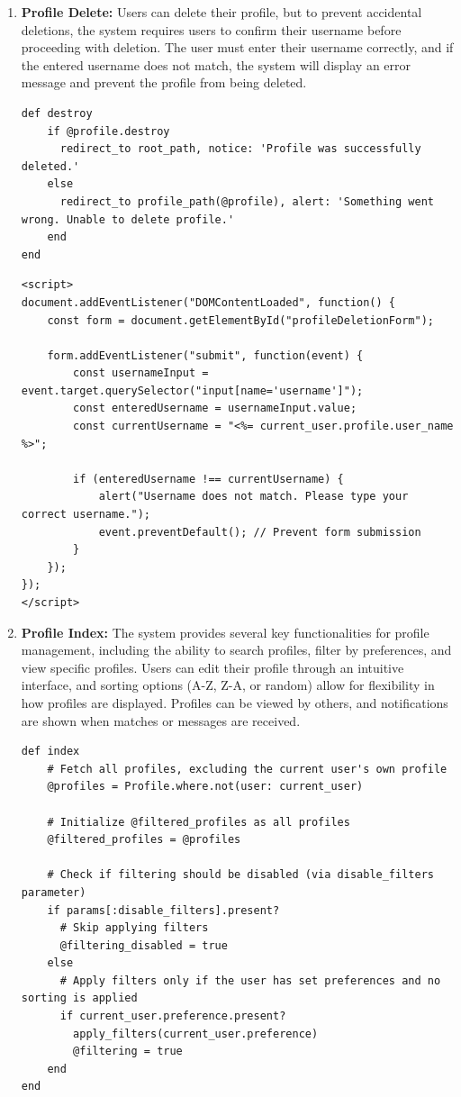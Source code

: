 \begin{enumerate}
    \newpage
    \item \textbf{Profile Delete:} 
    Users can delete their profile, but to prevent accidental deletions, the system requires users to confirm their username before proceeding with deletion. The user must enter their username correctly, and if the entered username does not match, the system will display an error message and prevent the profile from being deleted.
    \begin{lstlisting}
def destroy
    if @profile.destroy
      redirect_to root_path, notice: 'Profile was successfully deleted.'
    else
      redirect_to profile_path(@profile), alert: 'Something went wrong. Unable to delete profile.'
    end
end
    \end{lstlisting}

\begin{lstlisting}
<script>
document.addEventListener("DOMContentLoaded", function() {
    const form = document.getElementById("profileDeletionForm");

    form.addEventListener("submit", function(event) {
        const usernameInput = event.target.querySelector("input[name='username']");
        const enteredUsername = usernameInput.value;
        const currentUsername = "<%= current_user.profile.user_name %>";

        if (enteredUsername !== currentUsername) {
            alert("Username does not match. Please type your correct username.");
            event.preventDefault(); // Prevent form submission
        }
    });
});
</script>
\end{lstlisting}

    \newpage
    \item \textbf{Profile Index:} 
    The system provides several key functionalities for profile management, including the ability to search profiles, filter by preferences, and view specific profiles. Users can edit their profile through an intuitive interface, and sorting options (A-Z, Z-A, or random) allow for flexibility in how profiles are displayed. Profiles can be viewed by others, and notifications are shown when matches or messages are received.
    \begin{lstlisting}
def index
    # Fetch all profiles, excluding the current user's own profile
    @profiles = Profile.where.not(user: current_user)
  
    # Initialize @filtered_profiles as all profiles
    @filtered_profiles = @profiles

    # Check if filtering should be disabled (via disable_filters parameter)
    if params[:disable_filters].present?
      # Skip applying filters
      @filtering_disabled = true
    else
      # Apply filters only if the user has set preferences and no sorting is applied
      if current_user.preference.present?
        apply_filters(current_user.preference)
        @filtering = true
    end
end
\end{lstlisting}


\end{enumerate}
